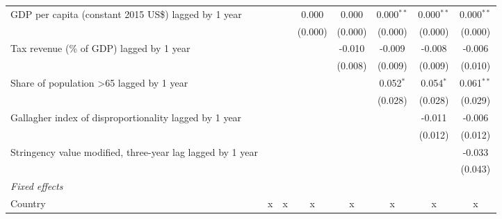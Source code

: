 \begin{tabular}{lccccccc}
   GDP per capita (constant 2015 US\$) lagged by 1 year                                   &              &              & 0.000        & 0.000        & 0.000$^{**}$ & 0.000$^{**}$ & 0.000$^{**}$\\   
                                                                                          &              &              & (0.000)      & (0.000)      & (0.000)      & (0.000)      & (0.000)\\   
   Tax revenue (\% of GDP) lagged by 1 year                                               &              &              &              & -0.010       & -0.009       & -0.008       & -0.006\\   
                                                                                          &              &              &              & (0.008)      & (0.009)      & (0.009)      & (0.010)\\   
   Share of population >65 lagged by 1 year                                               &              &              &              &              & 0.052$^{*}$  & 0.054$^{*}$  & 0.061$^{**}$\\   
                                                                                          &              &              &              &              & (0.028)      & (0.028)      & (0.029)\\   
   Gallagher index of disproportionality lagged by 1 year                                 &              &              &              &              &              & -0.011       & -0.006\\   
                                                                                          &              &              &              &              &              & (0.012)      & (0.012)\\   
   Stringency value modified, three-year lag lagged by 1 year                             &              &              &              &              &              &              & -0.033\\   
                                                                                          &              &              &              &              &              &              & (0.043)\\   
   \emph{Fixed effects}\\
   Country                                                                                & x            & x            & x            & x            & x            & x            & x\\  

\end{tabular}
